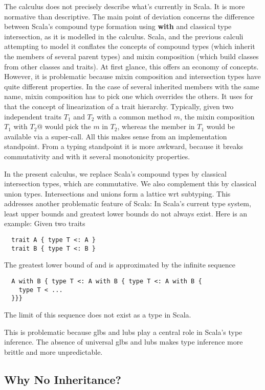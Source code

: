 \documentclass[9pt]{sigplanconf}
\begin{document}
The calculus does not precisely describe what's currently in Scala. It
is more normative than descriptive. The main point of deviation
concerns the difference between Scala's compound type formation using
{\bf with} and classical type intersection, as it is modelled in the
calculus. Scala, and the previous calculi attempting to model it
conflates the concepts of compound types (which inherit the members of
several parent types) and mixin composition (which build classes from
other classes and traits). At first glance, this offers an economy of
concepts. However, it is problematic because mixin composition and
intersection types have quite different properties. In the case of
several inherited members with the same name, mixin composition has to
pick one which overrides the others. It uses for that the concept of
linearization of a trait hierarchy. Typically, given two independent
traits $T_1$ and $T_2$ with a common method $m$, the mixin composition
\code@$T_1$ with $T_2$@ would pick the $m$ in $T_2$, whereas the member in
$T_1$ would be available via a super-call. All this makes sense from
an implementation standpoint. From a typing standpoint it is more
awkward, because it breaks commutativity and with it several
monotonicity properties.

In the present calculus, we replace Scala's compound types by
classical intersection types, which are commutative. We also
complement this by classical union types. Intersections and unions
form a lattice wrt subtyping. This addresses another problematic
feature of Scala: In Scala's current type system, least upper bounds
and greatest lower bounds do not always exist. Here is an example:
Given two traits
\begin{lstlisting}
  trait A { type T <: A }
  trait B { type T <: B }
\end{lstlisting}
The greatest lower bound of \code@A@ and \code@B@ is approximated by the
infinite sequence
\begin{lstlisting}
  A with B { type T <: A with B { type T <: A with B {
    type T < ...
  }}}
\end{lstlisting}
The limit of this sequence does not exist as a type in Scala.

This is problematic because glbs and lubs play a central role in
Scala's type inference. The absence of universal glbs and lubs makes
type inference more brittle and more unpredictable.

\subsection{Why No Inheritance?}
\end{document}

